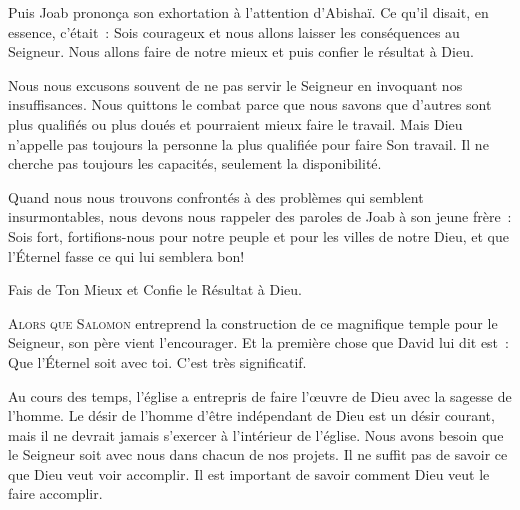 Puis Joab prononça son exhortation à l'attention d'Abishaï.
 Ce qu'il disait, en essence, c'était~:
 \og Sois courageux et nous allons laisser les conséquences au Seigneur.
 Nous allons faire de notre mieux et puis confier le résultat à Dieu. \fg{}


Nous nous excusons souvent de ne pas servir le Seigneur
 en invoquant nos insuffisances. Nous quittons le combat parce que nous savons
 que d'autres sont plus qualifiés ou plus doués
 et pourraient mieux faire le travail.
 Mais Dieu n'appelle pas toujours la personne la plus qualifiée
 pour faire Son travail. Il ne cherche pas toujours les capacités,
 seulement la disponibilité. 

Quand nous nous trouvons confrontés à des problèmes
 qui semblent insurmontables, nous devons nous rappeler des paroles de Joab
 à son jeune frère~:
 \og Sois fort, fortifions-nous pour notre peuple
 et pour les villes de notre Dieu,
 et que l'Éternel fasse ce qui lui semblera bon! \fg{}

Fais de Ton Mieux et Confie le Résultat à Dieu. 

\dvrule






\lettrine{A}{lors que Salomon} entreprend la construction
 de ce magnifique temple pour le Seigneur, son père vient l'encourager.
 Et la première chose que David lui dit est~:
 \og Que l'Éternel soit avec toi. \fg{} C'est très significatif. 

Au cours des temps, l'église 
 a entrepris de faire l'\oe{}uvre de Dieu
 avec la sagesse de l'homme. Le désir de l'homme d'être indépendant de Dieu
 est un désir courant, mais il ne devrait jamais s'exercer
 à l'intérieur de l'église.
 Nous avons besoin que le Seigneur soit avec nous dans chacun de nos projets.
 Il ne suffit pas de savoir ce que Dieu veut voir accomplir.
 Il est important de savoir comment Dieu veut le faire accomplir. 

